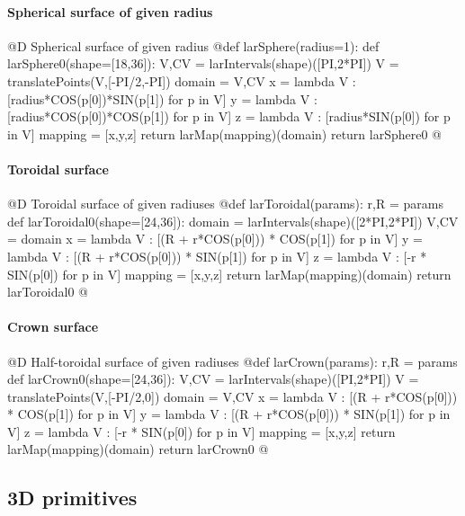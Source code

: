 \documentclass[11pt,oneside]{article}	%
\begin{document}
\paragraph{Spherical surface of given radius}
@D Spherical surface of given radius
@{def larSphere(radius=1):
	def larSphere0(shape=[18,36]):
		V,CV = larIntervals(shape)([PI,2*PI])
		V = translatePoints(V,[-PI/2,-PI])
		domain = V,CV
		x = lambda V : [radius*COS(p[0])*SIN(p[1]) for p in V]
		y = lambda V : [radius*COS(p[0])*COS(p[1]) for p in V]
		z = lambda V : [radius*SIN(p[0]) for p in V]
		mapping = [x,y,z]
		return larMap(mapping)(domain)
	return larSphere0
@}
\paragraph{Toroidal surface}
@D Toroidal surface of given radiuses
@{def larToroidal(params):
	r,R = params
	def larToroidal0(shape=[24,36]):
		domain = larIntervals(shape)([2*PI,2*PI])
		V,CV = domain
		x = lambda V : [(R + r*COS(p[0])) * COS(p[1]) for p in V]
		y = lambda V : [(R + r*COS(p[0])) * SIN(p[1]) for p in V]
		z = lambda V : [-r * SIN(p[0]) for p in V]
		mapping = [x,y,z]
		return larMap(mapping)(domain)
	return larToroidal0
@}
\paragraph{Crown surface}
@D Half-toroidal surface of given radiuses
@{def larCrown(params):
	r,R = params
	def larCrown0(shape=[24,36]):
		V,CV = larIntervals(shape)([PI,2*PI])
		V = translatePoints(V,[-PI/2,0])
		domain = V,CV
		x = lambda V : [(R + r*COS(p[0])) * COS(p[1]) for p in V]
		y = lambda V : [(R + r*COS(p[0])) * SIN(p[1]) for p in V]
		z = lambda V : [-r * SIN(p[0]) for p in V]
		mapping = [x,y,z]
		return larMap(mapping)(domain)
	return larCrown0
@}

\subsection{3D primitives}
\end{document}

